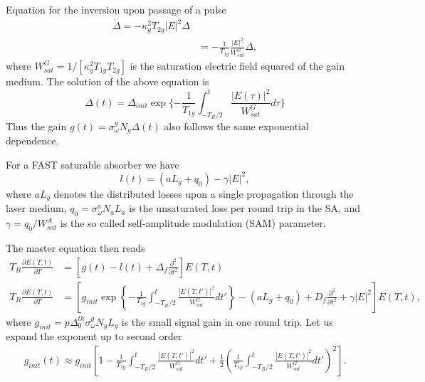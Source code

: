 \documentclass[preprint,secnumarabic,amssymb, nobibnotes, aip, prd]{revtex4-1}
\def\p{\partial}
\begin{document}
Equation for the inversion upon passage of a pulse 
\begin{align}
\dot \Delta = - \kappa_g^2T_{2g} |E|^2 \Delta  \nonumber \\
&= - \frac{1}{T_{1g}}\frac{|E|^2}{W_{sat}^G}\Delta, 
\end{align}
where $W_{sat}^G = 1/[\kappa_g^2T_{1g}T_{2g}]$ is the saturation electric field squared of the gain medium. The solution of the above equation is 
\begin{equation}
\Delta(t) = \Delta_{init}\exp\{-\frac{1}{T_{1g}} \int_{-T_R/2}^{t} \frac{|E(\tau)|^2}{W_{sat}^G}d\tau\}
\end{equation}
Thus the gain $g(t) = \sigma_\omega^g N_g \Delta(t)$ also follows the same exponential dependence.  

For a FAST saturable absorber we have~\cite{haus1975theory}
\begin{equation}
l(t) = (aL_g+q_0) -\gamma |E|^2,
\end{equation}
where $aL_g$ denotes the distributed losses upon a single propagation through the laser medium, $q_0 = \sigma_\omega^a N_aL_a$ is the unsaturated loss per round trip in the SA, and $\gamma = q_0/W_{sat}^A$ is the so called self-amplitude modulation (SAM) parameter.



The master equation then reads
\begin{align}
\label{eq:master-equation}
T_R \frac{\p E(T,t)}{\p T} &= \left[g(t) - l(t) +\Delta_f \frac{\p^2}{\p t^2}\right]E(T,t) \nonumber \\
T_R \frac{\p E(T,t)}{\p T} &= \left[ g_{init}\exp\left \{-\frac{1}{T_{1g}} \int_{-T_R/2}^{t} \frac{|E(T,t')|^2}{W_{sat}^G}dt' \right \} - (aL_g+q_0)  +D_f \frac{\p^2}{\p t^2} +\gamma |E|^2\right]E(T,t),
\end{align}
where $ g_{init} =  p\Delta_0^{th} \sigma_\omega^g N_g  L_g$ is the small signal gain in one round trip. 
Let us expand the exponent up to second order
\begin{align}
g_{init}(t) \approx  g_{init}\left [ 1-\frac{1}{T_{1g}} \int_{-T_R/2}^{t} \frac{|E(T,t')|^2}{W_{sat}^G}dt' +\frac{1}{2} \left(\frac{1}{T_{1g}} \int_{-T_R/2}^{t} \frac{|E(T,t')|^2}{W_{sat}^G}dt'\right)^2 \right ].
\end{align}
\end{document}
